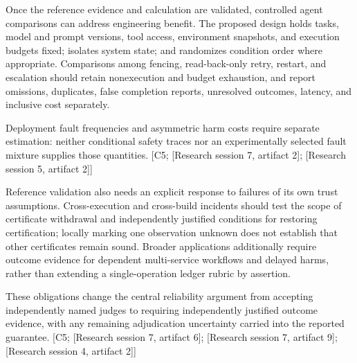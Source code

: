 \documentclass[11pt]{article}
\begin{document}
Once the reference evidence and calculation are validated, controlled agent comparisons can address engineering benefit. The proposed design holds tasks, model and prompt versions, tool access, environment snapshots, and execution budgets fixed; isolates system state; and randomizes condition order where appropriate. Comparisons among fencing, read-back-only retry, restart, and escalation should retain nonexecution and budget exhaustion, and report omissions, duplicates, false completion reports, unresolved outcomes, latency, and inclusive cost separately.

Deployment fault frequencies and asymmetric harm costs require separate estimation: neither conditional safety traces nor an experimentally selected fault mixture supplies those quantities. [C5; [Research session 7, artifact 2]; [Research session 5, artifact 2]]

Reference validation also needs an explicit response to failures of its own trust assumptions. Cross-execution and cross-build incidents should test the scope of certificate withdrawal and independently justified conditions for restoring certification; locally marking one observation unknown does not establish that other certificates remain sound. Broader applications additionally require outcome evidence for dependent multi-service workflows and delayed harms, rather than extending a single-operation ledger rubric by assertion.

These obligations change the central reliability argument from accepting independently named judges to requiring independently justified outcome evidence, with any remaining adjudication uncertainty carried into the reported guarantee. [C5; [Research session 7, artifact 6]; [Research session 7, artifact 9]; [Research session 4, artifact 2]]
\end{document}
